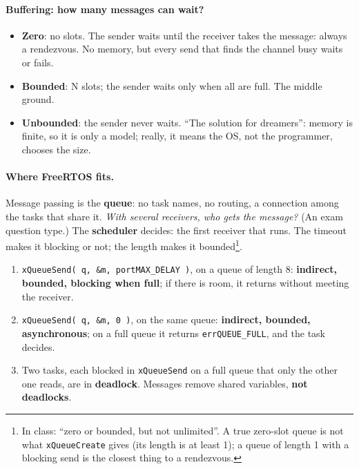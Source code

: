 \paragraph{Buffering: how many messages can wait?}
\begin{itemize}
    \item \textbf{Zero}: no slots. The sender waits until the receiver takes the message: always a rendezvous. No memory, but every send that finds the channel busy waits or fails.
    \item \textbf{Bounded}: N slots; the sender waits only when all are full. The middle ground.
    \item \textbf{Unbounded}: the sender never waits. ``The solution for dreamers'': memory is finite, so it is only a model; really, it means the OS, not the programmer, chooses the size.
\end{itemize}

\paragraph{Where FreeRTOS fits.} Message passing is the \textbf{queue}: no task names, no routing, a connection among the tasks that share it. \emph{With several receivers, who gets the message?} (An exam question type.) The \textbf{scheduler} decides: the first receiver that runs. The timeout makes it blocking or not; the length makes it bounded\footnote{In class: ``zero or bounded, but not unlimited''. A true zero-slot queue is not what \texttt{xQueueCreate} gives (its length is at least 1); a queue of length 1 with a blocking send is the closest thing to a rendezvous.}.
\begin{enumerate}
    \item \texttt{xQueueSend( q, \&m, portMAX\_DELAY )}, on a queue of length 8: \textbf{indirect, bounded, blocking when full}; if there is room, it returns without meeting the receiver.
    \item \texttt{xQueueSend( q, \&m, 0 )}, on the same queue: \textbf{indirect, bounded, asynchronous}; on a full queue it returns \texttt{errQUEUE\_FULL}, and the task decides.
    \item Two tasks, each blocked in \texttt{xQueueSend} on a full queue that only the other one reads, are in \textbf{deadlock}. Messages remove shared variables, \textbf{not deadlocks}.
\end{enumerate}

